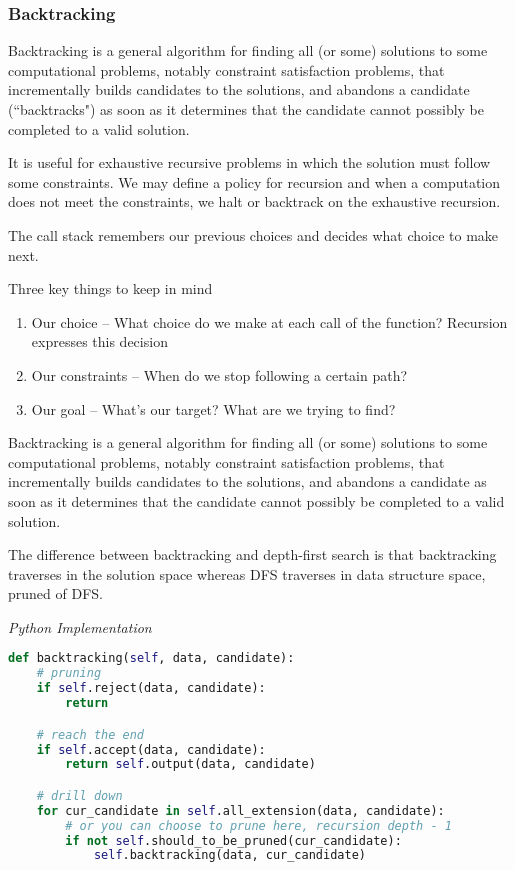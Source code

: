 \documentclass{article}
\begin{document}
    \subsubsection{Backtracking}
    Backtracking is a general algorithm for finding all (or some) solutions to some computational problems, notably constraint satisfaction problems, that incrementally builds candidates to the solutions, and abandons a candidate (``backtracks") as soon as it determines that the candidate cannot possibly be completed to a valid solution. 
    
    It is useful for exhaustive recursive problems in which the solution must follow some constraints. We may define a policy for recursion and when a computation does not meet the constraints, we halt or backtrack on the exhaustive recursion.
    
    The call stack remembers our previous choices and decides what choice to make next.
    
    Three key things to keep in mind
    \begin{enumerate}
        \item Our choice -- What choice do we make at each call of the function? Recursion expresses this decision
        \item Our constraints -- When do we stop following a certain path?
        \item Our goal -- What's our target? What are we trying to find?
    \end{enumerate}
    
    Backtracking is a general algorithm for finding all (or some) solutions to some computational problems, notably constraint satisfaction problems, that incrementally builds candidates to the solutions, and abandons a candidate as soon as it determines that the candidate cannot possibly be completed to a valid solution.

    The difference between backtracking and depth-first search is that backtracking traverses in the solution space whereas DFS traverses in data structure space, pruned of DFS.
    
\vspace{8pt} \emph{Python Implementation}
\begin{lstlisting}[language=Python]
def backtracking(self, data, candidate):
    # pruning
    if self.reject(data, candidate):
        return

    # reach the end
    if self.accept(data, candidate):
        return self.output(data, candidate)

    # drill down
    for cur_candidate in self.all_extension(data, candidate):
        # or you can choose to prune here, recursion depth - 1
        if not self.should_to_be_pruned(cur_candidate):
            self.backtracking(data, cur_candidate)
\end{lstlisting}
    
\end{document}

